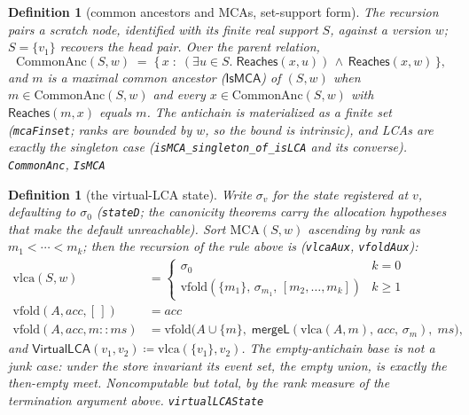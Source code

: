 \documentclass[11pt]{article}
\newtheorem{definition}[theorem]{Definition}
\newcommand{\mergeL}{\mathsf{mergeL}}
\newcommand{\Sinit}{\sigma_0}
\newcommand{\lean}[1]{\texttt{#1}}
\begin{document}
\begin{definition}[common ancestors and MCAs, set-support form]
\label{def:mca}
The recursion pairs a scratch node, identified with its finite real support $S$,
against a version $w$; $S = \{v_1\}$ recovers the head pair. Over the parent
relation,
\[
  \mathrm{CommonAnc}(S, w) \;=\;
  \{\, x \;:\; (\exists u \in S.\; \mathsf{Reaches}(x, u)) \,\wedge\,
  \mathsf{Reaches}(x, w) \,\},
\]
and $m$ is a \emph{maximal common ancestor} ($\mathsf{IsMCA}$) of $(S, w)$ when
$m \in \mathrm{CommonAnc}(S, w)$ and every $x \in \mathrm{CommonAnc}(S, w)$ with
$\mathsf{Reaches}(m, x)$ equals $m$. The antichain is materialized as a finite set
(\lean{mcaFinset}; ranks are bounded by $w$, so the bound is intrinsic), and LCAs are
exactly the singleton case (\lean{isMCA\_singleton\_of\_isLCA} and its converse).
\hfill\lean{CommonAnc}, \lean{IsMCA}
\end{definition}

\begin{definition}[the virtual-LCA state]
\label{def:vlca}
Write $\sigma_v$ for the state registered at $v$, defaulting to $\Sinit$
(\lean{stateD}; the canonicity theorems carry the allocation hypotheses that make
the default unreachable). Sort $\mathrm{MCA}(S, w)$ ascending by rank as
$m_1 < \cdots < m_k$; then the recursion of the rule above is
(\lean{vlcaAux}, \lean{vfoldAux}):
\begin{align*}
  \mathrm{vlca}(S, w) &=
  \begin{cases}
    \Sinit & k = 0\\
    \mathrm{vfold}(\{m_1\},\, \sigma_{m_1},\, [m_2, \dots, m_k]) & k \ge 1
  \end{cases}\\
  \mathrm{vfold}(A, \mathit{acc}, [\,]) &= \mathit{acc}\\
  \mathrm{vfold}(A, \mathit{acc}, m :: ms) &=
  \mathrm{vfold}\bigl(A \cup \{m\},\;
  \mergeL(\mathrm{vlca}(A, m),\, \mathit{acc},\, \sigma_m),\; ms\bigr),
\end{align*}
and $\mathsf{VirtualLCA}(v_1, v_2) \coloneqq \mathrm{vlca}(\{v_1\}, v_2)$.
The empty-antichain base is not a junk case: under the store invariant
its event set, the empty union, is exactly the then-empty meet.
Noncomputable but total, by the rank measure of the termination argument above.
\hfill\lean{virtualLCAState}
\end{definition}
\end{document}
